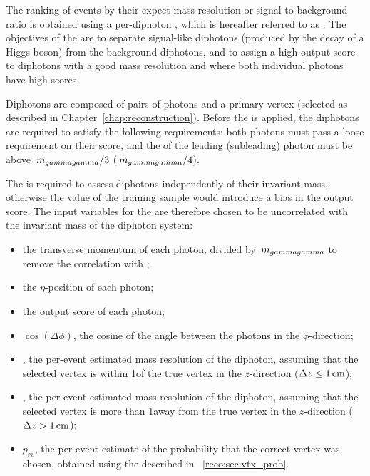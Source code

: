 The ranking of events by their expect mass resolution or signal-to-background ratio is obtained using a per-diphoton \BDT, which is hereafter referred to as \DiPhoBdt. The objectives of the \DiPhoBdt are to separate signal-like diphotons (produced by the decay of a Higgs boson) from the \SM background diphotons, and to assign a high output score to diphotons with a good mass resolution and where both individual photons have high \PhoIdBdt scores. 

Diphotons are composed of pairs of photons and a primary vertex (selected as described in Chapter~\ref{chap:reconstruction}). Before the \DiPhoBdt is applied, the diphotons are required to satisfy the following requirements: both photons must pass a loose requirement on their \PhoIdBdt score, and the \pT of the leading (subleading) photon must be above $\,m_{gammagamma}/3$ ($\,m_{gammagamma}/4$).

The \DiPhoBdt is required to assess diphotons independently of their invariant mass, otherwise the \mH value of the training sample would introduce a bias in the output score. The input variables for the \DiPhoBdt are therefore chosen to be uncorrelated with the invariant mass of the diphoton system:

\begin{itemize}
\item the transverse momentum of each photon, divided by $\,m_{gammagamma}$ to remove the correlation with \mH;
\item the $\eta$-position of each photon;
\item the \PhoIdBdt output score of each photon;
\item $\cos(\Delta\phi)$, the cosine of the angle between the photons in the $\phi$-direction;
\item \sigmarv, the per-event estimated mass resolution of the diphoton, assuming that the selected vertex is within 1\cm of the true vertex in the $z$-direction ($\Delta z \leq 1\,\text{cm}$);
\item \sigmawv, the per-event estimated mass resolution of the diphoton, assuming that the selected vertex is more than 1\cm away from the true vertex in the $z$-direction ($\Delta z > 1\,\text{cm}$);
\item $p_{rv}$, the per-event estimate of the probability that the correct vertex was chosen, obtained using the \VtxProbBdt described in \Sec~\ref{reco:sec:vtx_prob}.
\end{itemize}

